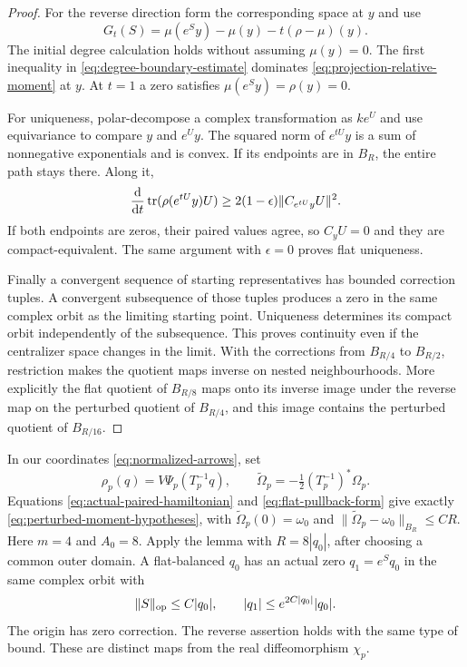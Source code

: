 \begin{proof}
For the reverse direction form the corresponding space
at $y$ and use
\[
 G_t(S)=\mu(e^Sy)-\mu(y)-t(\rho-\mu)(y).
\]
The initial degree calculation holds without assuming
$\mu(y)=0$. The first inequality in
\eqref{eq:degree-boundary-estimate} dominates
\eqref{eq:projection-relative-moment} at $y$.
At $t=1$ a zero satisfies $\mu(e^Sy)=\rho(y)=0$.

For uniqueness, polar-decompose a complex transformation
as $ke^U$ and use equivariance to compare $y$ and $e^Uy$.
The squared norm of $e^{tU}y$ is a sum of nonnegative
exponentials and is convex. If its endpoints are in
$B_R$, the entire path stays there. Along it,
\[
 \frac{\mathrm d}{\mathrm d t}\operatorname{tr}(\rho(e^{tU}y)U)
             \ge2(1-\epsilon)\|C_{e^{tU}y}U\|^2.
\]
If both endpoints are zeros, their paired values agree,
so $C_yU=0$ and they are compact-equivalent. The same
argument with $\epsilon=0$ proves flat uniqueness.

Finally a convergent sequence of starting representatives
has bounded correction tuples. A convergent subsequence
of those tuples produces a zero in the same complex orbit
as the limiting starting point. Uniqueness determines
its compact orbit independently of the subsequence.
This proves continuity even if the centralizer space
changes in the limit. With the corrections from $B_{R/4}$
to $B_{R/2}$, restriction makes the quotient maps inverse
on nested neighbourhoods. More explicitly the flat
quotient of $B_{R/8}$ maps onto its inverse image under
the reverse map on the perturbed quotient of $B_{R/4}$,
and this image contains the perturbed quotient of
$B_{R/16}$.
\end{proof}

In our coordinates \eqref{eq:normalized-arrows}, set
\begin{equation}\label{eq:orbit-correction-normalization}
 \rho_p(q)=V\Psi_p(T_p^{-1}q),\qquad
 \widetilde\Omega_p=-\tfrac12(T_p^{-1})^*\Omega_p.
\end{equation}
Equations \eqref{eq:actual-paired-hamiltonian} and
\eqref{eq:flat-pullback-form} give exactly
\eqref{eq:perturbed-moment-hypotheses}, with
$\widetilde\Omega_p(0)=\omega_0$ and
$\|\widetilde\Omega_p-\omega_0\|_{B_R}\le CR$.
Here $m=4$ and $A_0=8$.
Apply the lemma with $R=8|q_0|$, after choosing a common
outer domain. A flat-balanced $q_0$ has an actual zero
$q_1=e^Sq_0$ in the same complex orbit with
\begin{equation}\label{eq:small-orbit-correction}
 \|S\|_{\rm op}\le C|q_0|,\qquad
                    |q_1|\le e^{2C|q_0|}|q_0|.
\end{equation}
The origin has zero correction. The reverse assertion
holds with the same type of bound. These are distinct
maps from the real diffeomorphism $\chi_p$.

